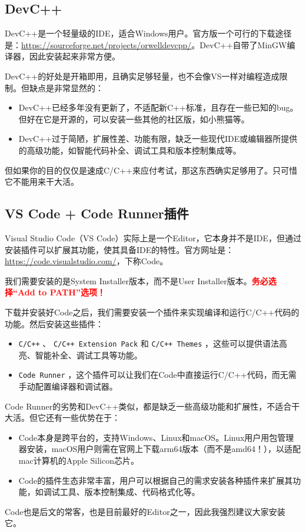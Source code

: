 \subsection{DevC++}

DevC++是一个轻量级的IDE，适合Windows用户。官方版一个可行的下载途径是：\url{https://sourceforge.net/projects/orwelldevcpp/}。DevC++自带了MinGW编译器，因此安装起来非常方便。

DevC++的好处是开箱即用，且确实足够轻量，也不会像VS一样对编程造成限制。但缺点是非常显然的：
\begin{itemize}
    \item DevC++已经多年没有更新了，不适配新C++标准，且存在一些已知的bug。但好在它是开源的，可以安装一些其他的社区版，如小熊猫等。
    \item DevC++过于简陋，扩展性差、功能有限，缺乏一些现代IDE或编辑器所提供的高级功能，如智能代码补全、调试工具和版本控制集成等。
\end{itemize}
但如果你的目的仅仅是速成C/C++来应付考试，那这东西确实足够用了。只可惜它不能用来干大活。

\subsection{VS Code + Code Runner插件}\label{sec:vs-code}

Visual Studio Code（VS Code）实际上是一个Editor，它本身并不是IDE，但通过安装插件可以扩展其功能，使其具备IDE的特性。官方网址是：\url{https://code.visualstudio.com/}，下称Code。

我们需要安装的是System Installer版本，而不是User Installer版本。\textcolor{red}{\bfseries 务必选择“Add to PATH”选项！}

下载并安装好Code之后，我们需要安装一个插件来实现编译和运行C/C++代码的功能。然后安装这些插件：
\begin{itemize}
    \item \verb|C/C++| 、 \verb|C/C++ Extension Pack| 和 \verb|C/C++ Themes| ，这些可以提供语法高亮、智能补全、调试工具等功能。
    \item \verb|Code Runner| ，这个插件可以让我们在Code中直接运行C/C++代码，而无需手动配置编译器和调试器。
\end{itemize}

Code Runner的劣势和DevC++类似，都是缺乏一些高级功能和扩展性，不适合干大活。但它还有一些优势在于：
\begin{itemize}
    \item Code本身是跨平台的，支持Windows、Linux和macOS。Linux用户用包管理器安装，macOS用户则需在官网上下载arm64版本（而不是amd64！），以适配mac计算机的Apple Silicon芯片。
    \item Code的插件生态非常丰富，用户可以根据自己的需求安装各种插件来扩展其功能，如调试工具、版本控制集成、代码格式化等。
\end{itemize}
Code也是后文的常客，也是目前最好的Editor之一，因此我强烈建议大家安装它。

